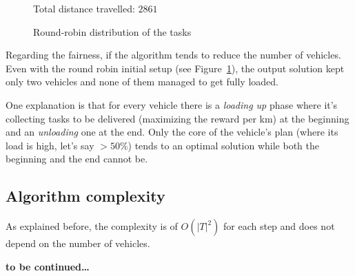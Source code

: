 \documentclass[11pt,a4paper]{article}
\begin{document}
\begin{figure}[ht!]
    \begin{center}
    \caption{Round-robin distribution of the tasks}{Total distance travelled: $2861$}
    \label{fig:rr}
    \end{center}
\end{figure}

Regarding the fairness, if the algorithm tends to reduce the number of vehicles.
Even with the round robin initial setup (see Figure~\ref{fig:rr}), the output solution
kept only two vehicles and none of them managed to get fully loaded.

One explanation is that for every vehicle there is a \emph{loading up} phase
where it's collecting tasks to be delivered (maximizing the reward per km) at
the beginning and an \emph{unloading} one at the end. Only the core of the
vehicle's plan (where its load is high, let's say $>50\%$) tends to an optimal
solution while both the beginning and the end cannot be.

\subsection*{Algorithm complexity}

As explained before, the complexity is of $O(|T|^2)$ for each step and does not
depend on the number of vehicles.

\textbf{to be continued\ldots}
\end{document}

